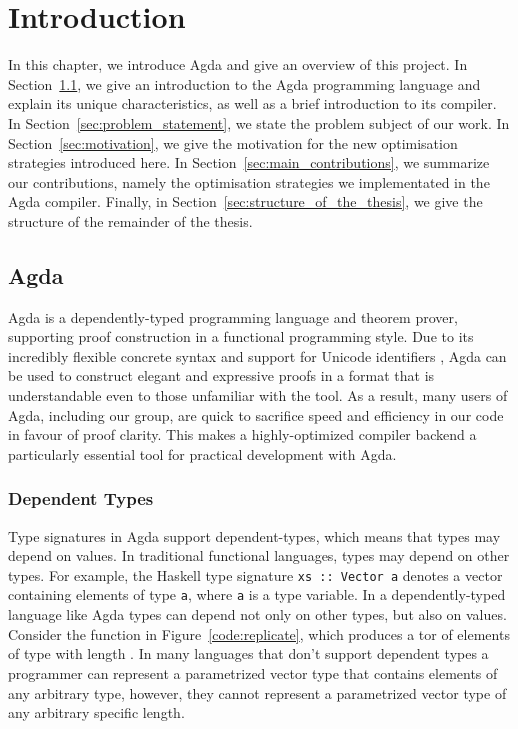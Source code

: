\chapter{Introduction}
\label{cha:introduction}

In this chapter, we introduce Agda and give an overview of this project. In Section~\ref{sec:intro_agda}, we give an introduction to the Agda programming language and explain its unique characteristics, as well as a brief introduction to its compiler. In Section~\ref{sec:problem_statement}, we state the problem subject of our work. In Section~\ref{sec:motivation}, we give the motivation for the new optimisation strategies introduced here. In Section~\ref{sec:main_contributions}, we summarize our contributions, namely the optimisation strategies we implementated in the Agda compiler. Finally, in Section~\ref{sec:structure_of_the_thesis}, we give the structure of the remainder of the thesis.

\section{Agda}
\label{sec:intro_agda}

Agda \cite{norell2007} is a dependently-typed programming language and theorem prover, supporting proof construction in a functional programming style. Due to its incredibly flexible concrete syntax and support for Unicode identifiers \cite{bove2009}, Agda can be used to construct elegant and expressive proofs in a format that is understandable even to those unfamiliar with the tool. As a result, many users of Agda, including our group, are quick to sacrifice speed and efficiency in our code in favour of proof clarity. This makes a highly-optimized compiler backend a particularly essential tool for practical development with Agda.

\subsection{Dependent Types}

Type signatures in Agda support dependent-types, which means that types may depend on values. In traditional functional languages, types may depend on other types. For example, the Haskell type signature \lstinline{xs :: Vector a} denotes a vector containing elements of type \lstinline{a}, where \lstinline{a} is a type variable. In a dependently-typed language like Agda types can depend not only on other types, but also on values. Consider the  function in Figure~\ref{code:replicate}, which produces a tor of elements of type  with length .\cite{norell2009} In many languages that don't support dependent types a programmer can represent a parametrized vector type that contains elements of any arbitrary type, however, they cannot represent a parametrized vector type of any arbitrary specific length.


